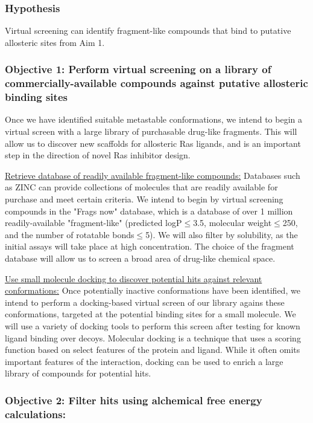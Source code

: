 \documentclass[12pt]{article}
\begin{document}
\subsubsection*{Hypothesis}
Virtual screening can identify fragment-like compounds that bind to putative allosteric sites from Aim 1.

\subsubsection*{Objective 1: Perform virtual screening on a library of commercially-available compounds against putative allosteric binding sites}

Once we have identified suitable metastable conformations, we intend to begin a virtual screen with a large library of purchasable drug-like fragments. This will allow us to discover new scaffolds for allosteric Ras ligands, and is an important step in the direction of novel Ras inhibitor design.

\underline{Retrieve database of readily available fragment-like compounds:} Databases such as ZINC \cite{irwin2012} can provide collections of molecules that are readily available for purchase and meet certain criteria. We intend to begin by virtual screening compounds in the "Frags now"  database, which is a database of over 1 million readily-available "fragment-like" (predicted logP$\leq$3.5, molecular weight$\leq$250, and the number of rotatable bonds$\leq$5). We will also filter by solubility, as the initial assays will take place at high concentration. The choice of the fragment database will allow us to screen a broad area of drug-like chemical space.

\underline{Use small molecule docking to discover potential hits against relevant conformations:} Once potentially inactive conformations have been identified, we intend to perform a docking-based virtual screen of our library agains these conformations, targeted at the potential binding sites for a small molecule. We will use a variety of docking tools to perform this screen after testing for known ligand binding over decoys. Molecular docking is a technique that uses a scoring function based on select features of the protein and ligand. While it often omits important features of the interaction, docking can be used to enrich a large library of compounds for potential hits. \cite{dockingrev}

\subsubsection*{Objective 2: Filter hits using alchemical free energy calculations:}
\end{document}

